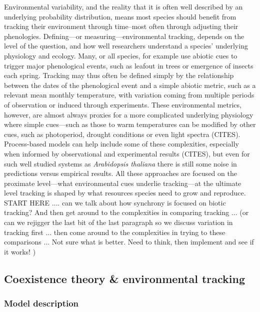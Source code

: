 \documentclass[11pt,letterpaper]{article}
\begin{document}
Environmental variability, and the reality that it is often well described by an underlying probability distribution, means most species should benefit from tracking their environment through time--most often through adjusting their phenologies. Defining---or measuring---environmental tracking, depends on the level of the question, and how well researchers understand a species' underlying physiology and ecology. Many, or all species, for example use abiotic cues to trigger major phenological events, such as leafout in trees or emergence of insects each spring. Tracking may thus often be defined simply by the relationship between the dates of the phenological event and a simple abiotic metric, such as a relevant mean monthly temperature, with variation coming from multiple periods of observation or induced through experiments. These environmental metrics, however, are almost always proxies for a more complicated underlying physiology where simple cues---such as those to warm temperatures can be modified by other cues, such as photoperiod, drought conditions or even light spectra (CITES). Process-based models can help include some of these complexities, especially when informed by observational and experimental results (CITES), but even for such well studied systems as \emph{Arabidopsis thaliana} there is still some noise in predictions versus empirical results. All these approaches  are focused on the proximate level---what environmental cues underlie tracking---at the ultimate level tracking is shaped by what resources species need to grow and reproduce. \\

START HERE .... can we talk about how synchrony is focused on biotic tracking? And then get around to the complexities in comparing tracking ... (or can we rejigger the last bit of the last paragraph so we discuss variation in tracking first ... then come around to the complexities in trying to these comparisons ... Not sure what is better. Need to think, then implement and see if it works! )

\subsection{Coexistence theory \& environmental tracking}


\subsubsection{Model description}
\end{document}
